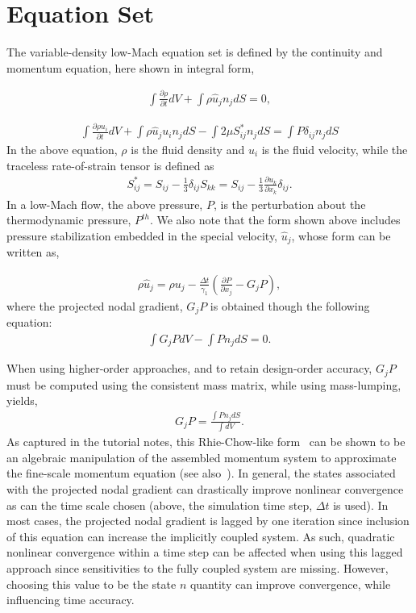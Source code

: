 \documentclass{article}
\begin{document}
\section{Equation Set}
The variable-density low-Mach equation set is defined by the continuity and momentum equation, here shown in
integral form,

\begin{align}
 \int  \frac {\partial \rho }{\partial t} dV + \int \rho \hat{u}_j n_j dS = 0,
\label{eq:contEq}
\end{align} 

\begin{align}
\int  \frac {\partial \rho u_i }{\partial t} dV + \int \rho \hat{u}_j u_i n_j dS 
-\int 2 \mu S^*_{ij} n_j dS = \int P \delta_{ij} n_j dS
\label{eq:momEq}
\end{align}
%
In the above equation, $\rho$ is the fluid density and $u_i$ is the fluid velocity, while
the traceless rate-of-strain tensor is defined as
\begin{align}
S^*_{ij}  = S_{ij} - \frac{1}{3} \delta_{ij} S_{kk} \nonumber
		     = S_{ij} - \frac{1}{3} \frac{\partial  u_k }{\partial x_k}\delta_{ij}.
\end{align}
In a low-Mach flow, the above pressure, $P$, is the perturbation about the thermodynamic
pressure, $P^{th}$. We also note that the form shown above includes pressure stabilization
embedded in the special velocity, $\hat{u}_j$, whose form can be written as,

\begin{align}
\rho \hat{u}_j = \rho u_j -\frac{\Delta t}{\gamma_1}\left(\frac{\partial P}{\partial x_j} - G_j P\right),
\end{align}
where the projected nodal gradient, $G_jP$ is obtained though the following equation:
\begin{align}
\int G_j P dV - \int P n_j dS = 0.
\end{align}

When using higher-order approaches, and to retain design-order accuracy, $G_jP$ must be computed
using the consistent mass matrix, while using mass-lumping, yields,
\begin{align}
G_j P = \frac{\int P n_j dS}{\int dV}.
\end{align}
As captured in the tutorial notes, this Rhie-Chow-like form~\cite{rhieChow1983} can be shown to be an algebraic manipulation of the
assembled momentum system to approximate the fine-scale momentum equation (see also~\cite{martinez2017}). In general, the
states associated with the projected nodal gradient can drastically improve nonlinear convergence as can the time scale chosen 
(above, the simulation time step, $\Delta t$ is used). In most cases, the projected nodal gradient is lagged by one iteration since inclusion of this
equation can increase the implicitly coupled system. As such, quadratic nonlinear convergence
within a time step can be affected when using this lagged approach since sensitivities to the fully coupled system are missing. However, 
choosing this value to be the state $n$ quantity can improve convergence, while influencing time accuracy. 
\end{document}
